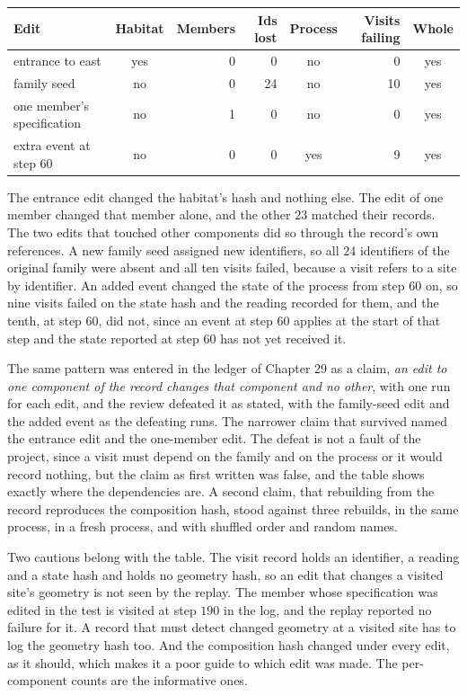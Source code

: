\begin{center}
\small
\setlength{\tabcolsep}{4pt}
\begin{tabular}{lcrrcrc}
\toprule
Edit & Habitat & Members & Ids lost & Process & Visits failing & Whole\\
\midrule
entrance to east & yes & 0 & 0 & no & 0 & yes\\
family seed & no & 0 & 24 & no & 10 & yes\\
one member's specification & no & 1 & 0 & no & 0 & yes\\
extra event at step 60 & no & 0 & 0 & yes & 9 & yes\\
\bottomrule
\end{tabular}
\end{center}

The entrance edit changed the habitat's hash and nothing else. The edit of one member changed that member alone, and the other $23$ matched their records. The two edits that touched other components did so through the record's own references. A new family seed assigned new identifiers, so all $24$ identifiers of the original family were absent and all ten visits failed, because a visit refers to a site by identifier. An added event changed the state of the process from step $60$ on, so nine visits failed on the state hash and the reading recorded for them, and the tenth, at step $60$, did not, since an event at step $60$ applies at the start of that step and the state reported at step $60$ has not yet received it.

The same pattern was entered in the ledger of Chapter 29 as a claim, \emph{an edit to one component of the record changes that component and no other}, with one run for each edit, and the review defeated it as stated, with the family-seed edit and the added event as the defeating runs. The narrower claim that survived named the entrance edit and the one-member edit. The defeat is not a fault of the project, since a visit must depend on the family and on the process or it would record nothing, but the claim as first written was false, and the table shows exactly where the dependencies are. A second claim, that rebuilding from the record reproduces the composition hash, stood against three rebuilds, in the same process, in a fresh process, and with shuffled order and random names.

Two cautions belong with the table. The visit record holds an identifier, a reading and a state hash and holds no geometry hash, so an edit that changes a visited site's geometry is not seen by the replay. The member whose specification was edited in the test is visited at step $190$ in the log, and the replay reported no failure for it. A record that must detect changed geometry at a visited site has to log the geometry hash too. And the composition hash changed under every edit, as it should, which makes it a poor guide to which edit was made. The per-component counts are the informative ones.

